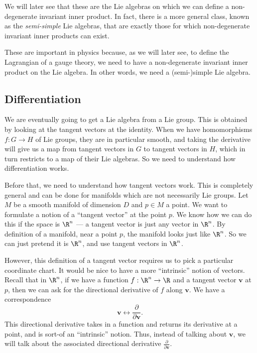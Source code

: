 \documentclass[a4paper]{article}
\begin{document}
We will later see that these are the Lie algebras on which we can define a non-degenerate invariant inner product. In fact, there is a more general class, known as the \emph{semi-simple} Lie algebras, that are exactly those for which non-degenerate invariant inner products can exist.

These are important in physics because, as we will later see, to define the Lagrangian of a gauge theory, we need to have a non-degenerate invariant inner product on the Lie algebra. In other words, we need a (semi-)simple Lie algebra.


\subsection{Differentiation}
We are eventually going to get a Lie algebra from a Lie group. This is obtained by looking at the tangent vectors at the identity. When we have homomorphisms $f: G \to H$ of Lie groups, they are in particular smooth, and taking the derivative will give us a map from tangent vectors in $G$ to tangent vectors in $H$, which in turn restricts to a map of their Lie algebras. So we need to understand how differentiation works.

Before that, we need to understand how tangent vectors work. This is completely general and can be done for manifolds which are not necessarily Lie groups. Let $M$ be a smooth manifold of dimension $D$ and $p \in M$ a point. We want to formulate a notion of a ``tangent vector'' at the point $p$. We know how we can do this if the space is $\R^n$ --- a tangent vector is just any vector in $\R^n$. By definition of a manifold, near a point $p$, the manifold looks just like $\R^n$. So we can just pretend it is $\R^n$, and use tangent vectors in $\R^n$.

However, this definition of a tangent vector requires us to pick a particular coordinate chart. It would be nice to have a more ``intrinsic'' notion of vectors. Recall that in $\R^n$, if we have a function $f: \R^n \to \R$ and a tangent vector $\mathbf{v}$ at $p$, then we can ask for the directional derivative of $f$ along $\mathbf{v}$. We have a correspondence
\[
  \mathbf{v} \longleftrightarrow \frac{\partial}{\partial \mathbf{v}}.
\]
This directional derivative takes in a function and returns its derivative at a point, and is sort-of an ``intrinsic'' notion. Thus, instead of talking about $\mathbf{v}$, we will talk about the associated directional derivative $\frac{\partial}{\partial \mathbf{v}}$.
\end{document}
